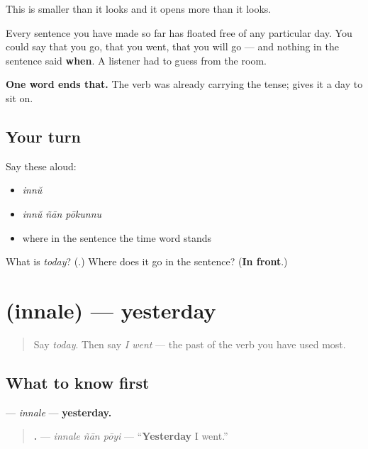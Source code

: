 \begin{grammarlens}[title={What you've built}]
This is smaller than it looks and it opens more than it looks.

Every sentence you have made so far has floated free of any particular day. You could say that you go, that you went, that you will go — and nothing in the sentence said \textbf{when}. A listener had to guess from the room.

\textbf{One word ends that.} The verb was already carrying the tense; \textbf{} gives it a day to sit on.
\end{grammarlens}

\subsection*{Your turn}
Say these aloud:

\begin{itemize}
\raggedright
  \item \emph{innŭ}
  \item \emph{innŭ ñān pōkunnu}
  \item where in the sentence the time word stands
\end{itemize}

\begin{tcolorbox}[breakable,colback=teal!4,colframe=teal!35!black,title={Before you move on}]
What is \emph{today}? (\textbf{}.) Where does it go in the sentence? (\textbf{In front}.)
\end{tcolorbox}
\section[\texorpdfstring{\ml{ഇന്നലെ} (innale)}{ഇന്നലെ (innale)}]{ (innale) — yesterday}

\label{lesson:ML-C94-innale}



\begin{quote}
Say \emph{today}. Then say \emph{I went} — the past of the verb you have used most.
\end{quote}

\subsection*{What to know first}
\textbf{} — \emph{innale} — \textbf{yesterday.}

\begin{quote}
\textbf{  .} — \emph{innale ñān pōyi} — \textquotedblleft{}\textbf{Yesterday} I went.\textquotedblright{}
\end{quote}


